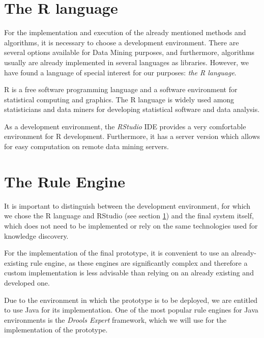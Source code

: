 \section{The R language}
\label{sec:the_r_language}
For the implementation and execution of the already mentioned methods and algorithms, it is necessary to choose a development environment. There are several options available for Data Mining purposes, and furthermore, algorithms usually are already implemented in several languages as libraries. However, we have found a language of special interest for our purposes: \emph{the R language}\cite{ihaka1996r}.

R is a free software programming language and a software environment for statistical computing and graphics. The R language is widely used among statisticians and data miners for developing statistical software and data analysis\cite{vance2009data,quick2010statistical}.

As a development environment, the \emph{RStudio}\cite{racine2012rstudio} IDE provides a very comfortable environment for R development. Furthermore, it has a server version which allows for easy computation on remote data mining servers. 

\section{The Rule Engine}
It is important to distinguish between the development environment, for which we chose the R language and RStudio (see section \ref{sec:the_r_language}) and the final system itself, which does not need to be implemented or rely on the same technologies used for knowledge discovery.

For the implementation of the final prototype, it is convenient to use an already-existing rule engine\cite{liang2009openrulebench}, as these engines are significantly complex and therefore a custom implementation is less advisable than relying on an already existing and developed one.

Due to the environment in which the prototype is to be deployed, we are entitled to use Java for its implementation. One of the most popular rule engines for Java environments is the \emph{Drools Expert}\cite{browne2009jboss,proctor2007relational} framework, which we will use for the implementation of the prototype.